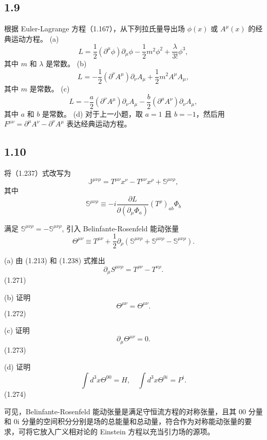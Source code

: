 \newpage
\subsection{1.9}
根据 Euler-Lagrange 方程（1.167），从下列拉氏量导出场 $\phi(x)$ 或 $A^\mu(x)$ 的经典运动方程。
(a) $$L = \frac{1}{2}(\partial^\mu \phi)\partial_\mu \phi - \frac{1}{2}m^2 \phi^2 + \frac{\lambda}{3!} \phi^3,$$
其中 $m$ 和 $\lambda$ 是常数。
(b) $$L = -\frac{1}{2}(\partial^\nu A^\mu)\partial_\nu A_\mu + \frac{1}{2}m^2 A^\mu A_\mu,$$
其中 $m$ 是常数。
(c) $$L = -\frac{a}{2}(\partial^\nu A^\mu)\partial_\nu A_\mu - \frac{b}{2}(\partial^\mu A^\nu)\partial_\nu A_\mu,$$
其中 $a$ 和 $b$ 是常数。
(d) 对于上一小题，取 $a = 1$ 且 $b = -1$，然后用 $F^{\mu\nu} = \partial^\mu A^\nu - \partial^\nu A^\mu$ 表达经典运动方程。

\newpage
\subsection{1.10}
将（1.237）式改写为
$$\mathbb{J}^{\mu\nu\rho} = T^{\mu\nu}x^\nu - T^{\mu\nu}x^\rho + \mathbb{S}^{\mu\nu\rho},$$
其中
$$\mathbb{S}^{\mu\nu\rho} \equiv -i\frac{\partial L}{\partial (\partial_\mu \Phi_a)} (T^\rho)_{ab}\Phi_b$$

满足 $\mathbb{S}^{\mu\nu\rho} = -\mathbb{S}^{\mu\nu\rho}$, 引入 Belinfante-Rosenfeld 能动张量
$$\Theta^{\mu\nu} \equiv T^{\mu\nu} + \frac{1}{2}\partial_\rho (\mathbb{S}^{\mu\nu\rho} + \mathbb{S}^{\mu\nu\rho} - \mathbb{S}^{\mu\nu\rho}).$$

(a) 由 (1.213) 和 (1.238) 式推出
$$\partial_\mu S^{\mu\nu\rho} = T^{\rho\nu} - T^{\nu\rho}.$$    (1.271)

(b) 证明
$$\Theta^{\mu\nu} = \Theta^{\mu\nu}.$$    (1.272)

(c) 证明
$$\partial_\mu \Theta^{\mu\nu} = 0.$$    (1.273)

(d) 证明
$$\int d^3x \Theta^{00} = H, \quad \int d^3x \Theta^{0i} = P^i.$$    (1.274)

可见，Belinfante-Rosenfeld 能动张量是满足守恒流方程的对称张量，且其 00 分量和 0i 分量的空间积分分别是场的总能量和总动量，符合作为对称能动张量的要求，可将它放入广义相对论的 Einstein 方程以充当引力场的源项。






